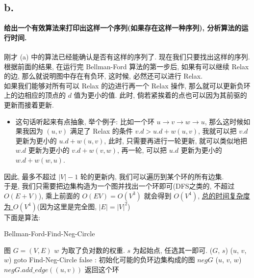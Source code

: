 \documentclass[UTF8]{article}
\newcommand{\jumpLine} {\hspace*{\fill} \\}
\begin{document}
\subsection*{b.}
\noindent \textbf{给出一个有效算法来打印出这样一个序列(如果存在这样一种序列), 分析算法的运行时间.}\\
\jumpLine
刚才 (a) 中的算法已经能确认是否有这样的序列了. 现在我们只要找出这样的序列. 根据前面的结果, 在运行完 Bellman-Ford 算法的第一步后, 如果有可以继续 {\sc Relax} 的边, 那么就说明图中存在有负环, 这时候, 必然还可以进行 {\sc Relax}. \\
如果我们能够对所有可以 {\sc Relax} 的边进行再一个 {\sc Relax} 操作, 那么就可以更新负环上的边相应的顶点的 $d$ 值为更小的值. 此时, 倘若紧挨着的点也可以因为其前驱的更新而接着更新.
\begin{itemize}
\item 这句话听起来有点抽象, 举个例子: 比如一个环 $u\rightarrow v\rightarrow w\rightarrow u$, 那么这时候如果我因为 $(u,v)$ 满足了 {\sc Relax} 的条件 $v.d>u.d+w(u,v)$, 我就可以把 $v.d$ 更新为更小的 $u.d+w(u,v)$, 此时, 只需要再进行一轮更新, 就可以类似地把 $w.d$ 更新为更小的 $v.d+w(v,w)$, 再一轮, 可以把 $u.d$ 更新为更小的 $w.d+w(w,u)$. 
\end{itemize}
因此, 最多不超过 $|V|-1$ 轮的更新内, 我们可以遍历到某个环的所有边集.\\
于是, 我们只需要把边集构造为一个图并找出一个环即可(DFS之类的, 不超过 $O(E+V)$), 乘上前面的 $O(EV)=O(V^3)$ 就会得到 $O(V^4)$, \underline{总的时间复杂度为 $O(V^4)$}(因为这里是完全图, $|E|=|V|^2$)\\
下面是算法:
\begin{algorithm}[H]
	\caption{{\sc Bellman-Ford-Find-Neg-Circle}}
	\begin{algorithmic}[1] %
		\Require 图 $G=(V,E)$
		\Require $w$ 为取了负对数的权重.
		\Require $s$ 为起始点, 任选其一即可.
		($G$, $s$)
		 
				($u$, $v$, $w$)
			\EndFor
		\EndFor
			\State goto {\sc Find-Neg-Circle} 
			\EndIf
		\EndFor
		\State \Return false 
		:
		\State 初始化可能的负环边集构成的图 $negG$ 
		 
			 
				($u$, $v$, $w$)
				\State $negG.add\_edge((u,v))$
				 
					\State \Return 返回这个环
				\EndIf
			\EndFor
		\EndFor
		\EndFunction
	\end{algorithmic}
\end{algorithm}
\end{document}
